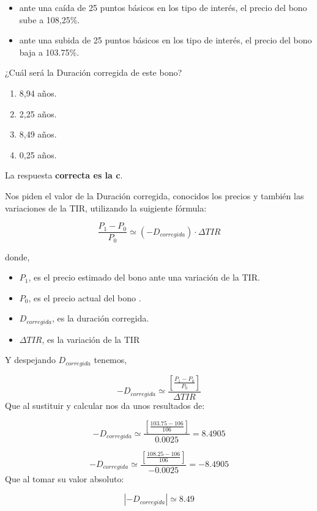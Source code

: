\documentclass[
  letterpaper,
  DIV=11,
  numbers=noendperiod]{scrreprt}
\begin{document}
\begin{itemize}
\item
  ante una caída de 25 puntos básicos en los tipo de interés, el precio
  del bono sube a 108,25\%.
\item
  ante una subida de 25 puntos básicos en los tipo de interés, el precio
  del bono baja a 103.75\%.
\end{itemize}

¿Cuál será la Duración corregida de este bono?

\begin{enumerate}
\def\labelenumi{\alph{enumi})}
\item
  8,94 años.
\item
  2,25 años.
\item
  8,49 años.
\item
  0,25 años.
\end{enumerate}

\begin{tcolorbox}[enhanced jigsaw, left=2mm, opacityback=0, colback=white, breakable, arc=.35mm, bottomrule=.15mm, rightrule=.15mm, toprule=.15mm, leftrule=.75mm, colframe=quarto-callout-tip-color-frame]
\begin{minipage}[t]{5.5mm}
\textcolor{quarto-callout-tip-color}{\faLightbulb}
\end{minipage}%
\begin{minipage}[t]{\textwidth - 5.5mm}

La respuesta \textbf{correcta es la c}.

Nos piden el valor de la Duración corregida, conocidos los precios y
también las variaciones de la TIR, utilizando la suigiente fórmula:

\[\frac{P_1-P_0}{P_0}\simeq \left(-D_{corregida}\right)\cdot\Delta TIR\]

donde,

\begin{itemize}
\item
  \(P_1\), es el precio estimado del bono ante una variación de la TIR.
\item
  \(P_0\), es el precio actual del bono .
\item
  \(D_{corregida}\), es la duración corregida.
\item
  \(\Delta TIR\), es la variación de la TIR
\end{itemize}

Y despejando \(D_{corregida}\) tenemos,

\[-D_{corregida}\simeq\frac{\left[\frac{P_1-P_0}{P_0} \right] }{ \Delta TIR}\]
Que al sustituir y calcular nos da unos resultados de:

\[-D_{corregida}\simeq\frac{\left[\frac{103.75-106}{106} \right] }{0.0025}=8.4905\]

\[-D_{corregida}\simeq\frac{\left[\frac{108.25-106}{106} \right] }{ -0.0025}=-8.4905\]
Que al tomar su valor absoluto:

\[\left|-D_{corregida}\right|\simeq8.49\]

\end{minipage}%
\end{tcolorbox}
\end{document}
